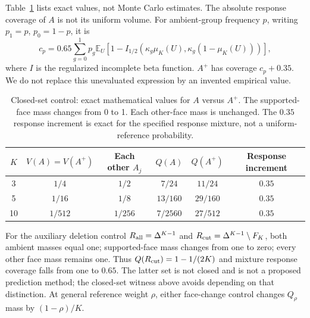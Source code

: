 \documentclass{article}
\theoremstyle{plain}
\newcommand{\simp}{\Delta^{K-1}}
\newcommand{\E}{\mathbb{E}}
\begin{document}
Table~\ref{tab:exact-control} lists exact values, not Monte Carlo estimates. The absolute response coverage of $A$ is not its uniform volume. For ambient-group frequency $p$, writing $p_1=p$, $p_0=1-p$, it is
\begin{equation}
 c_p=0.65\sum_{g=0}^1 p_g\E_U\left[1-I_{1/2}\!\left(\kappa_g\mu_K(U),\kappa_g(1-\mu_K(U))\right)\right],
 \label{eq:cp}
\end{equation}
where $I$ is the regularized incomplete beta function. $A^+$ has coverage $c_p+0.35$. We do not replace this unevaluated expression by an invented empirical value.

\begin{table}[htbp]
\caption{Closed-set control: exact mathematical values for $A$ versus $A^+$. The supported-face mass changes from 0 to 1. Each other-face mass is unchanged. The $0.35$ response increment is exact for the specified response mixture, not a uniform-reference probability.}
\label{tab:exact-control}
\centering
\begin{tabular}{cccccc}
\toprule
$K$ & $V(A)=V(A^+)$ & Each other $A_j$ & $Q(A)$ & $Q(A^+)$ & Response increment \\
\midrule
3 & $1/4$ & $1/2$ & $7/24$ & $11/24$ & $0.35$ \\
5 & $1/16$ & $1/8$ & $13/160$ & $29/160$ & $0.35$ \\
10 & $1/512$ & $1/256$ & $7/2560$ & $27/512$ & $0.35$ \\
\bottomrule
\end{tabular}
\end{table}

For the auxiliary deletion control $R_{\rm all}=\simp$ and $R_{\rm cut}=\simp\setminus F_K$, both ambient masses equal one; supported-face mass changes from one to zero; every other face mass remains one. Thus $Q(R_{\rm cut})=1-1/(2K)$ and mixture response coverage falls from one to $0.65$. The latter set is not closed and is not a proposed prediction method; the closed-set witness above avoids depending on that distinction. At general reference weight $\rho$, either face-change control changes $Q_\rho$ mass by $(1-\rho)/K$.

\begin{table}[htbp]
\caption{Executed closed-set control: measured response coverage gain, averaging source and shifted mixture panels within seed, versus exact geometric and response increments. Only the measured column has descriptive 95\% bootstrap uncertainty. Geometric increments are analytic assignments, not MC estimates or empirical discoveries. Source: \texttt{control\_summary.csv}.}
\label{tab:controls}
\centering

\end{table}
\end{document}
